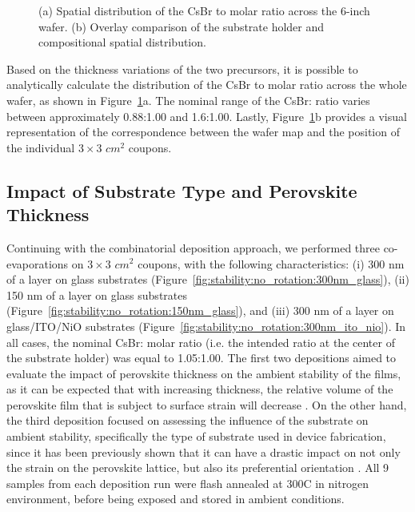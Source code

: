 \begin{figure}[htbp]
\caption[Spatial distribution of the CsBr to  molar ratio across the 6-inch wafer and overlay comparison with the substrate holder.]{(a) Spatial distribution of the CsBr to  molar ratio across the 6-inch wafer. (b) Overlay comparison of the substrate holder and compositional spatial distribution.}
\label{fig:stability:ellipsometry:molar_ratio}

\end{figure}


Based on the thickness variations of the two precursors, it is possible to analytically calculate the distribution of the CsBr to  molar ratio across the whole wafer, as shown in Figure~\ref{fig:stability:ellipsometry:molar_ratio}a. The nominal range of the CsBr: ratio varies between approximately 0.88:1.00 and 1.6:1.00. Lastly, Figure~\ref{fig:stability:ellipsometry:molar_ratio}b provides a visual representation of the correspondence between the wafer map and the position of the individual $3\times3$ $cm^2$ coupons.
 

\subsection{Impact of Substrate Type and Perovskite Thickness}

Continuing with the combinatorial deposition approach, we performed three co-evaporations on $3\times3$ $cm^2$ coupons, with the following characteristics: (i) 300 nm of a  layer on glass substrates (Figure~\ref{fig:stability:no_rotation:300nm_glass}), (ii) 150 nm of a  layer on glass substrates (Figure~\ref{fig:stability:no_rotation:150nm_glass}), and (iii) 300 nm of a  layer on glass/ITO/NiO substrates (Figure~\ref{fig:stability:no_rotation:300nm_ito_nio}). In all cases, the nominal CsBr: molar ratio (i.e. the intended ratio at the center of the substrate holder) was equal to 1.05:1.00. The first two depositions aimed to evaluate the impact of perovskite thickness on the ambient stability of the films, as it can be expected that with increasing thickness, the relative volume of the perovskite film that is subject to surface strain will decrease \cite{Steele2019ThermalFilms}. On the other hand, the third deposition focused on assessing the influence of the substrate on ambient stability, specifically the type of substrate used in device fabrication, since it has been previously shown that it can have a drastic impact on not only the strain on the perovskite lattice, but also its preferential orientation \cite{Abzieher2021FromCells, Xue2020RegulatingLayers}. All 9 samples from each deposition run were flash annealed at 300\degree C in nitrogen environment, before being exposed and stored in ambient conditions. 


